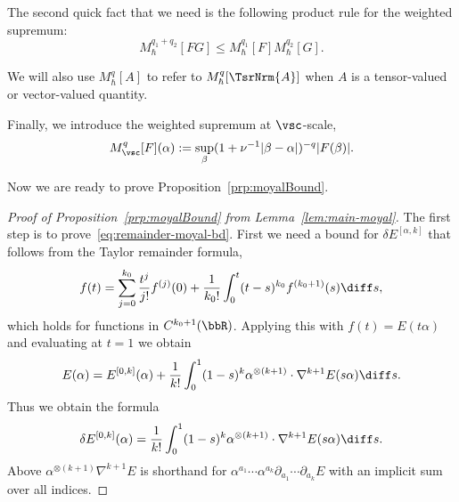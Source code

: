 \documentclass{article}
\numberwithin{equation}{section}
\begin{document}
The second quick fact that we need is the following product rule for the weighted supremum:
\begin{equation}
	\label{eq:maximal-prod-rule}
	M_\hbar^{q_1+q_2}[FG] \leq M_\hbar^{q_1}[F] M_\hbar^{q_2}[G].
\end{equation}

We will also use $M_\hbar^q[A]$ to refer
to $M_\hbar^q[\TsrNrm{A}]$ when $A$ is a tensor-valued
or vector-valued quantity. 

Finally, we introduce the weighted supremum at $\vsc$-scale,
\begin{equation}
    M_\vsc^q[F](\alpha)
    := \sup_{\beta}(1 + \nu^{-1}|\beta-\alpha|)^{-q}|F(\beta)|.
\end{equation}

Now we are ready to prove Proposition~\ref{prp:moyalBound}.
\begin{proof}[Proof of Proposition~\ref{prp:moyalBound} from Lemma~\ref{lem:main-moyal}]
	
	The first step is to prove~\eqref{eq:remainder-moyal-bd}.
	First we need a bound for $\delta E^{[\alpha,k]}$ that follows from the Taylor remainder formula,
	\begin{equation}
		\label{eq:third-order-remainder}
		f(t) =
		\sum_{j=0}^{k_0} \frac{t^j}{j!} f^{(j)}(0)
		+ \frac{1}{k_0!} \int_0^t (t-s)^{k_0} f^{(k_0+1)}(s)\diff s,
	\end{equation}
	which holds for functions in $C^{k_0+1}(\bbR)$.
	Applying this with $f(t) = E(t\alpha)$ and evaluating at $t=1$ we obtain 
	\begin{equation}
		\label{eq:third-remainder-alpha}
		E(\alpha) = E^{[0,k]}(\alpha)
		+ \frac{1}{k!} \int_0^1 (1-s)^{k} \alpha^{\otimes ({k+1})}\cdot \nabla^{k+1} E(s\alpha)\diff s.
	\end{equation}
	Thus we obtain the formula
	\[
	\delta E^{[0,k]}(\alpha) =
	\frac{1}{k!} \int_0^1 (1-s)^{k} \alpha^{\otimes (k+1)} \cdot \nabla^{k+1} E(s\alpha)\diff s.
	\]
	Above $\alpha^{\otimes(k+1)} \nabla^{k+1}E$ is shorthand for 
	$\alpha^{a_1}\cdots\alpha^{a_k}
	\partial_{a_1}\cdots \partial_{a_k}E$ with an implicit
	sum over all indices.
 

\end{proof}
\end{document}
